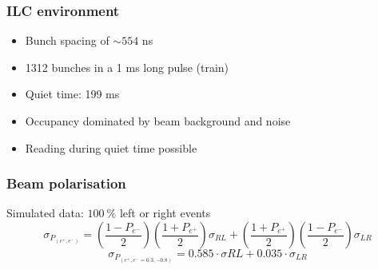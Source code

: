 \documentclass{beamer}
\begin{document}
  \begin{frame}
    \frametitle{ILC environment}

    \begin{itemize}
      \item Bunch spacing of $\sim 554$ ns
      \item 1312 bunches in a 1 ms long pulse (train)
      \item Quiet time: 199 ms
      \item Occupancy dominated by beam background and noise
      \item Reading during quiet time possible
    \end{itemize}

  \end{frame}

  \begin{frame}[plain]
    \frametitle{Beam polarisation}

    \begin{block}{Simulated data: $100~\%$ left or right events}
      \footnotesize{
      \[ \sigma_{P_{(e^+,e^-)}} = \left( \frac{1-P_{e^-}}{2} \right) \left( \frac{1+P_{e^+}}{2} \right) \sigma_{RL} + \left( \frac{1+P_{e^+}}{2} \right) \left( \frac{1-P_{e^-}}{2} \right) \sigma_{LR} \]
      \[ \sigma_{P_{(e^+,e^- = 0.3, -0.8)}} = 0.585 \cdot \sigma{RL} + 0.035 \cdot \sigma_{LR} \]
      }
    \end{block}
  \end{frame}

    


\end{document}
